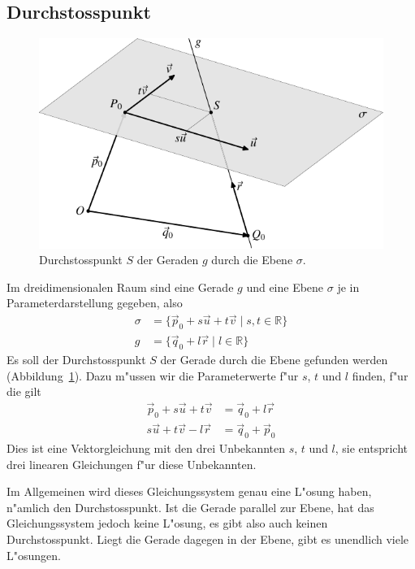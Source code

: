 \subsection{Durchstosspunkt\label{subsection-durchstosspunkt}}
\begin{figure}
\begin{center}
\includegraphics{images/v-9}
\end{center}
\caption{Durchstosspunkt $S$ der Geraden $g$ durch die Ebene
$\sigma$.\label{image-durchstosspunkt}}
\end{figure}
Im dreidimensionalen Raum
sind eine Gerade $g$ und eine Ebene $\sigma$ je in Parameterdarstellung gegeben, also
\begin{align*}
\sigma&=
\{
\vec p_0+s\vec u+t\vec v\;
|\;s, t\in\mathbb R\}
\\
g&=
\{
\vec q_0+l\vec r\;
|\;l\in\mathbb R
\}
\end{align*}
Es soll der Durchstosspunkt $S$ der Gerade durch die Ebene gefunden
werden (Abbildung~\ref{image-durchstosspunkt}).
Dazu m"ussen wir die Parameterwerte f"ur $s$, $t$ und $l$ finden,
f"ur die gilt
\begin{align*}
\vec p_0+s\vec u+t\vec v
&=
\vec q_0+l\vec r
\\
s\vec u+t\vec v-l\vec r&=\vec q_0+\vec p_0
\end{align*}
Dies ist eine Vektorgleichung mit den drei Unbekannten $s$, $t$ und $l$,
sie entspricht drei linearen Gleichungen f"ur diese Unbekannten.

Im Allgemeinen wird dieses Gleichungssystem genau eine L"osung haben,
n"amlich den Durchstosspunkt.
Ist die Gerade parallel zur Ebene, hat das Gleichungssystem jedoch keine
L"osung, es gibt also auch keinen Durchstosspunkt.
Liegt die Gerade dagegen in der Ebene, gibt es unendlich viele L"osungen.

